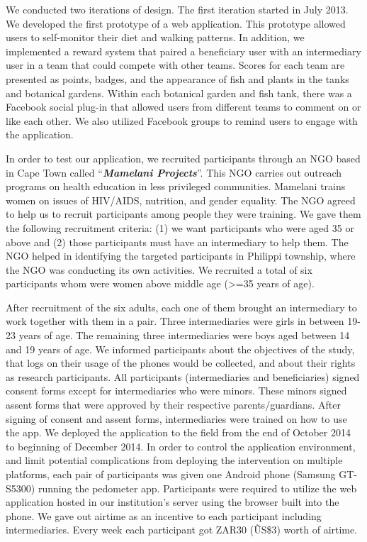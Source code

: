 \documentclass{sig-alternate}
\begin{document}
We conducted two iterations of design. The first iteration started in July
2013. We developed the first prototype of a web application. This prototype
allowed users to self-monitor their diet and walking patterns. In
addition, we implemented a reward system that paired a beneficiary user with
an intermediary user in a team that could compete with other teams. Scores for
each team are presented as points, badges, and the appearance of fish and plants
in the 
tanks and botanical gardens. Within each botanical garden and fish tank, there
was a Facebook social plug-in that allowed users from different teams to
comment on or like each other. We also utilized Facebook groups to remind
users to engage with the application.

In order to test our application, we recruited participants through an NGO
based in Cape Town called ``\textbf{\textit{Mamelani Projects}}''. This NGO
carries out outreach programs on health education in less privileged
communities. Mamelani trains women on
issues of HIV/AIDS, nutrition, and gender equality. 
The NGO agreed to help us to recruit participants
among people they were training. We gave them the following recruitment
criteria: (1) we want participants who were aged 35 or above and (2) those
participants must have an intermediary to help them. The NGO helped in
identifying the targeted participants in Philippi township, where the
NGO was conducting its own activities. We recruited a total of
six participants whom were women above middle age (>=35 years of age).

After recruitment of the six adults, each one of them brought an intermediary
to work together with them in a pair. Three intermediaries were girls in
between 19-23 years of age. The remaining three intermediaries were boys aged
between 14 and 19 years of age. 
We informed participants about the objectives of the study,
that logs on their usage of the phones would be collected, and about 
their rights as research participants.
All participants (intermediaries and
beneficiaries) signed consent forms except for intermediaries who were minors.
These minors signed assent forms that were approved by their respective
parents/guardians. 
After signing of consent and
assent forms, intermediaries were trained on how to use the app. We deployed
the application to the field from the end of October 2014 to beginning of
December 2014. In order to control the application environment, and limit 
potential complications from deploying the intervention on multiple platforms, 
each pair of participants was given one Android phone (Samsung
GT-S5300) running the pedometer app. Participants were required to utilize the
web application hosted in our institution's server using the browser built
into the phone. 
We gave out  airtime as an
incentive to each participant including intermediaries. Every week each
participant got ZAR30 (\~US\$3) worth of airtime.
\end{document}
